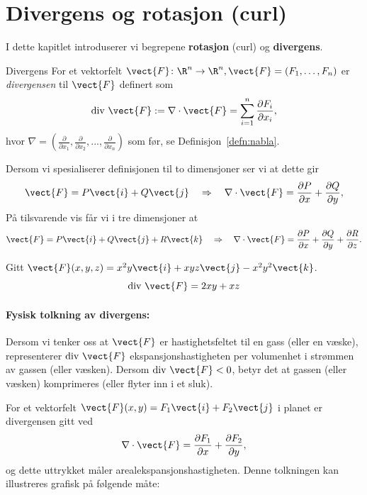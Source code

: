 %
%
%
\section{Divergens og rotasjon (curl)}\label{div_curl}

I dette kapitlet introduserer vi begrepene \textbf{rotasjon} (curl) og \textbf{divergens}. 

\begin{defn}{Divergens}
For et vektorfelt $\vect{F}\colon \R^n\rightarrow \R^n , \vect{F}=(F_1,\ldots, F_n)$ er \emph{divergensen} til $\vect{F}$ definert som 
\[\text{div }\vect{F} := \nabla\cdot \vect{F}=\sum_{i=1}^n \frac{\partial F_i}{\partial x_i},\]
hvor $\nabla=(\frac{\partial}{\partial x_1},\frac{\partial}{\partial x_2},..., \frac{\partial}{\partial x_n})$ som før, se Definisjon~\ref{defn:nabla}.
\end{defn}
Dersom vi spesialiserer definisjonen til to dimensjoner ser vi at dette gir 
\begin{align*}
\vect{F} = P\vect{i} + Q\vect{j}\quad\Rightarrow\quad\nabla\cdot\vect{F} = \frac{\partial P}{\partial x} + \frac{\partial Q}{\partial y},
\end{align*}
På tilsvarende vis får vi i tre dimensjoner at
\begin{align*}
\vect{F} = P\vect{i} + Q\vect{j} + R\vect{k}\quad\Rightarrow\quad\nabla\cdot\vect{F} = \frac{\partial P}{\partial x} + \frac{\partial Q}{\partial y} + \frac{\partial R}{\partial z} .
\end{align*}


\begin{eks}{}
Gitt $\vect{F}(x,y,z) = x^2y \vect{i} + xyz \vect{j} - x^2y^2 \vect{k}$.
\[
\text{div } \vect{F} = 2xy + xz
\]
\end{eks}{}
\paragraph{Fysisk tolkning av divergens:} Dersom vi tenker oss at $\vect{F}$ er hastighetsfeltet til en gass (eller en væske), representerer $\text{div }\vect{F}$ ekspansjonshastigheten per volumenhet i strømmen av gassen (eller væsken). 
Dersom $\text{div } \vect{F} < 0$, betyr det at gassen (eller væsken) komprimeres (eller flyter inn i et sluk).

For et vektorfelt $\vect{F}(x, y) = F_1 \vect{i} + F_2 \vect{j}$ i planet er divergensen gitt ved
\[
\nabla \cdot \vect{F} = \frac{\partial F_1}{\partial x} + \frac{\partial F_2}{\partial y},
\]
og dette uttrykket måler arealekspansjonshastigheten.
Denne tolkningen kan illustreres grafisk på følgende måte:

